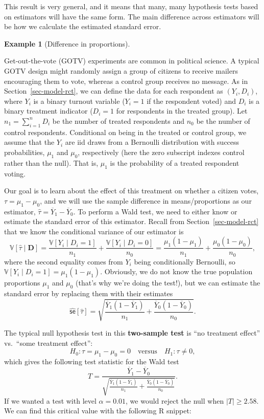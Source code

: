 \documentclass[
  13pt,
  letterpaper,
  DIV=11,
  numbers=noendperiod]{scrreprt}
\newcommand{\V}{\mathbb{V}}
\newcommand{\Ybar}{\overline{Y}}
\theoremstyle{plain}
\theoremstyle{plain}
\theoremstyle{definition}
\theoremstyle{definition}
\newtheorem{example}{Example}[chapter]
\theoremstyle{remark}
\begin{document}
This result is very general, and it means that many, many hypothesis
tests based on estimators will have the same form. The main difference
across estimators will be how we calculate the estimated standard error.

\begin{example}[Difference in
proportions]\protect\hypertarget{exm-two-props}{}\label{exm-two-props}

Get-out-the-vote (GOTV) experiments are common in political science. A
typical GOTV design might randomly assign a group of citizens to receive
mailers encouraging them to vote, whereas a control group receives no
message. As in Section~\ref{sec-model-rct}, we can define the data for
each respondent as \((Y_i, D_i)\), where \(Y_i\) is a binary turnout
variable (\(Y_i = 1\) if the respondent voted) and \(D_i\) is a binary
treatment indicator (\(D_i = 1\) for respondents in the treated group).
Let \(n_1 = \sum_{i=1}^n D_i\) be the number of treated respondents and
\(n_0\) be the number of control respondents. Conditional on being in
the treated or control group, we assume that the \(Y_i\) are iid draws
from a Bernoulli distribution with success probabilities, \(\mu_1\) and
\(\mu_0\), respectively (here the zero subscript indexes control rather
than the null). That is, \(\mu_1\) is the probability of a treated
respondent voting.

Our goal is to learn about the effect of this treatment on whether a
citizen votes, \(\tau = \mu_1 - \mu_0\), and we will use the sample
difference in means/proportions as our estimator,
\(\widehat{\tau} = \Ybar_1 - \Ybar_0\). To perform a Wald test, we need
to either know or estimate the standard error of this estimator. Recall
from Section~\ref{sec-model-rct} that we know the conditional variance
of our estimator is \[ 
\V[\widehat{\tau} \mid \mathbf{D}] = \frac{\V[Y_i \mid D_i = 1]}{n_1} + \frac{\V[Y_i \mid D_i = 0]}{n_0} = \frac{\mu_1(1-\mu_1)}{n_1} + \frac{\mu_0(1-\mu_0)}{n_0},
\] where the second equality comes from \(Y_i\) being conditionally
Bernoulli, so \(\V[Y_i \mid D_i = 1] = \mu_1(1- \mu_1)\). Obviously, we
do not know the true population proportions \(\mu_1\) and \(\mu_0\)
(that's why we're doing the test!), but we can estimate the standard
error by replacing them with their estimates \[ 
\widehat{\textsf{se}}[\widehat{\tau}] = \sqrt{\frac{\Ybar_1(1 -\Ybar_1)}{n_1} + \frac{\Ybar_0(1-\Ybar_0)}{n_0}}.
\]

The typical null hypothesis test in this \textbf{two-sample test} is
``no treatment effect'' vs.~``some treatment effect'': \[
H_0: \tau = \mu_1 - \mu_0 = 0 \quad\text{versus}\quad H_1: \tau \neq 0,
\] which gives the following test statistic for the Wald test \[
T = \frac{\Ybar_1 - \Ybar_0}{\sqrt{\frac{\Ybar_1(1 -\Ybar_1)}{n_1} + \frac{\Ybar_0(1-\Ybar_0)}{n_0}}}. 
\] If we wanted a test with level \(\alpha = 0.01\), we would reject the
null when \(|T| \geq 2.58\). We can find this critical value with the
following R snippet:


\end{example}
\end{document}
